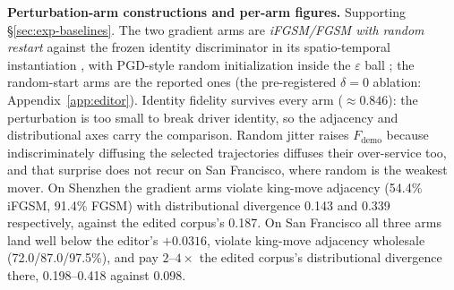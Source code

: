 \textbf{Perturbation-arm constructions and per-arm figures.} Supporting
\S\ref{sec:exp-baselines}. The two gradient arms are \emph{iFGSM\slash FGSM
with random restart} \cite{kurakin2017ifgsm,goodfellow2015fgsm} against the
frozen identity discriminator in its spatio-temporal instantiation
\cite{hu2023stifgsm}, with PGD-style random initialization inside the
$\varepsilon$ ball \cite{madry2018pgd}; the random-start arms are the reported
ones (the pre-registered $\delta = 0$ ablation:
Appendix~\ref{app:editor}). Identity fidelity survives every arm
($\approx 0.846$): the perturbation is too small to break driver identity, so
the adjacency and distributional axes carry the comparison. Random jitter
raises $F_{\mathrm{demo}}$ because indiscriminately diffusing the selected
trajectories diffuses their over-service too, and that surprise does not recur
on San Francisco, where random is the weakest mover.
On Shenzhen the gradient arms violate king-move adjacency (54.4\% iFGSM,
91.4\% FGSM) with distributional divergence 0.143 and 0.339 respectively,
against the edited corpus's 0.187.
On San Francisco all three arms land well below the editor's $+0.0316$,
violate king-move adjacency wholesale (72.0/87.0/97.5\%), and pay
$2$--$4\times$ the edited corpus's distributional divergence there,
0.198--0.418 against 0.098.


